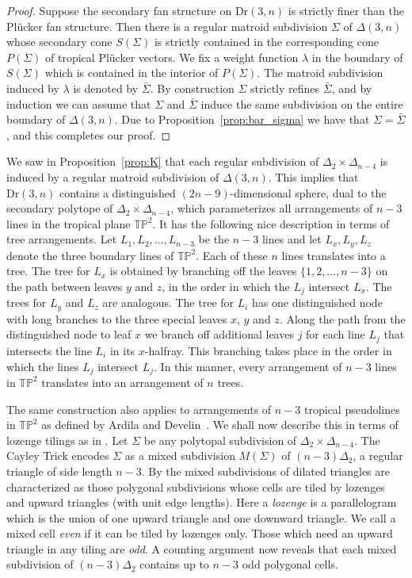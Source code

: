 \documentclass[12pt,a4paper]{amsart}
\theoremstyle{definition}
\newcommand{\Dr}{{\mathrm{Dr}}}
\newcommand{\TP}{{\mathbb{TP}}}
\begin{document}
\begin{proof}
  Suppose the secondary fan structure on $\Dr(3,n)$ is strictly finer
  than the Pl\"ucker fan structure.  Then there is a regular matroid
  subdivision $\Sigma$ of $\Delta(3,n)$ whose secondary cone
  $S(\Sigma)$ is strictly contained in the corresponding cone
  $P(\Sigma)$ of tropical Pl\"ucker vectors.  We fix a weight function
  $\lambda$ in the boundary of $S(\Sigma)$ which is contained in the
  interior of $P(\Sigma)$.  The matroid subdivision induced by
  $\lambda$ is denoted by $\bar\Sigma$.  By construction $\Sigma$
  strictly refines $\bar\Sigma$, and by induction we can assume that
  $\Sigma$ and $\bar\Sigma$ induce the same subdivision on the entire
  boundary of $\Delta(3,n)$.  Due to Proposition~\ref{prop:bar_sigma}
  we have that $\Sigma=\bar\Sigma$, and this completes our proof.
\end{proof}

We saw in Proposition~\ref{prop:K} that each regular subdivision of
$\Delta_{2}\times\Delta_{n-4}$ is induced by a regular matroid
subdivision of $\Delta(3,n)$. This implies that $\Dr(3,n)$ contains a
distinguished $(2n-9)$-dimensional sphere, dual to the secondary
polytope of $\Delta_{2}\times\Delta_{n-4}$, which parameterizes all
arrangements of $n-3$ lines in the tropical plane $\TP^2$. It has the
following nice description in terms of tree arrangements.  Let $L_1,
L_2, \ldots, L_{n-3}$ be the $n-3$ lines and let $L_x, L_y, L_z$
denote the three boundary lines of $\TP^2$.  Each of these $n$ lines
translates into a tree. The tree for $L_x$ is obtained by branching
off the leaves $\{1,2,\ldots,n-3\}$ on the path between leaves $y$ and
$z$, in the order in which the $L_j$ intersect $L_x$.  The trees for
$L_y$ and $L_z$ are analogous.  The tree for $L_i$ has one
distinguished node with long branches to the three special leaves $x$,
$y$ and $z$.  Along the path from the distinguished node to leaf $x$
we branch off additional leaves $j$ for each line $L_j$ that
intersects the line $L_i$ in its $x$-halfray.  This branching takes
place in the order in which the lines $L_j$ intersect $L_j$.  In this
manner, every arrangement of $n-3$ lines in $\TP^2$ translates into an
arrangement of $n$ trees.

The same construction also applies to arrangements of $n-3$ tropical
pseudolines in $\TP^2$ as defined by Ardila and Develin~\cite{AD}.  We
shall now describe this in terms of lozenge tilings as in \cite{S}.
Let $\Sigma$ be any polytopal subdivision of
$\Delta_{2}\times\Delta_{n-4}$.  The Cayley Trick encodes $\Sigma$ as
a mixed subdivision $M(\Sigma)$ of $(n-3)\Delta_{2}$, a regular
triangle of side length $n-3$.  By \cite[Theorem~3.5]{S} the mixed
subdivisions of dilated triangles are characterized as those polygonal
subdivisions whose cells are tiled by lozenges and upward triangles
(with unit edge lengths).  Here a \emph{lozenge} is a parallelogram
which is the union of one upward triangle and one downward triangle.
We call a mixed cell \emph{even} if it can be tiled by lozenges only.
Those which need an upward triangle in any tiling are \emph{odd}.  A
counting argument now reveals that each mixed subdivision of
$(n-3)\Delta_{2}$ contains up to $n-3$ odd polygonal cells.
\end{document}
